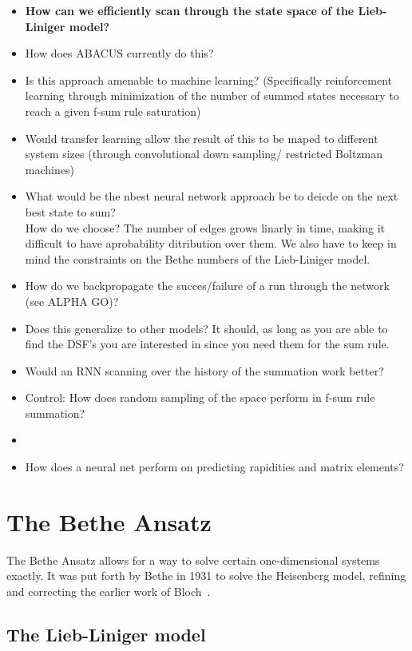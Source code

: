 \documentclass[11pt, a4paper]{report} %
\begin{document}
\begin{itemize}
  \item \textbf{How can we efficiently scan through the state space of the Lieb-Liniger model?}
  \item How does ABACUS currently do this?
  \item Is this approach amenable to machine learning? (Specifically reinforcement learning through minimization of the number of summed states necessary to reach a given f-sum rule saturation)
  \item Would transfer learning allow the result of this to be maped to different system sizes (through convolutional down sampling/ restricted Boltzman machines)
  \item What would be the nbest neural network approach be to deicde on the next best state to sum? \\ How do we choose? The number of edges grows linarly in time, making it difficult to have aprobability ditribution over them. We also have to keep in mind the constraints on the Bethe numbers of the Lieb-Liniger model.    
  \item How do we backpropagate the succes/failure of a run through the network (see ALPHA GO)?
  \item Does this generalize to other models? It should, as long as you are able to find the DSF's you are interested in since you need them for the sum rule.
  \item Would an RNN scanning over the history of the summation work better?
  \item Control: How does random sampling of the space perform in f-sum rule summation?
  \item
  \item How does a neural net perform on predicting rapidities and matrix elements?
\end{itemize}

\chapter{The Bethe Ansatz}\label{chap:bethe_ansatz}

The Bethe Ansatz allows for a way to solve certain one-dimensional systems exactly.
It was put forth by Bethe in 1931 to solve the Heisenberg model, refining and correcting the earlier work of Bloch~\cite{Bethe1931}.

\section{The Lieb-Liniger model}
\end{document}
